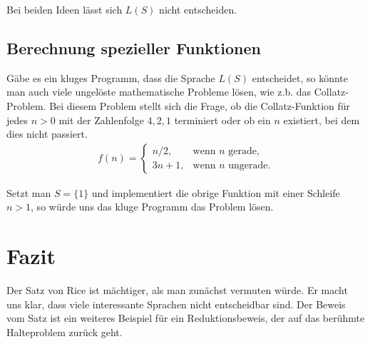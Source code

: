 \documentclass[journal]{IEEEtran}
\begin{document}
Bei beiden Ideen lässt sich $L(S)$ nicht entscheiden.

\subsection{Berechnung spezieller Funktionen}

Gäbe es ein kluges Programm, dass die Sprache $L(S)$ entscheidet, so könnte man auch viele ungelöste mathematische Probleme lösen, wie z.b. das Collatz-Problem. Bei diesem Problem stellt sich die Frage, ob die Collatz-Funktion für jedes $n > 0$ mit der Zahlenfolge $4, 2, 1$ terminiert oder ob ein $n$ existiert, bei dem dies nicht passiert.
\begin{align*}
  f(n)=\begin{cases}
  n/2,  & \text{wenn }n\text{ gerade,}\\
  3n+1, & \text{wenn }n\text{ ungerade.}
\end{cases}
\end{align*}

Setzt man $S = \{ 1 \}$ und implementiert die obrige Funktion mit einer Schleife $n > 1$, so würde uns das kluge Programm das Problem lösen.

%



\section{Fazit}

Der Satz von Rice ist mächtiger, als man zunächst vermuten würde. Er macht uns klar, dass viele interessante Sprachen nicht entscheidbar sind. Der Beweis vom Satz ist ein weiteres Beispiel für ein Reduktionsbeweis, der auf das berühmte Halteproblem zurück geht.




\end{document}
